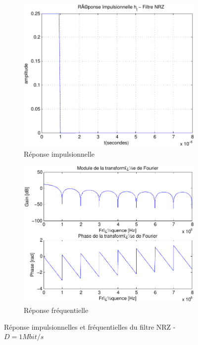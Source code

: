 \documentclass[a4paper,11pt]{article}
\begin{document}
\begin{figure}
	\begin{subfigure}{.5\textwidth}
  		\centering
  		\includegraphics[width=1\linewidth]{impul_nrz-crop.pdf}
  		\caption{Réponse impulsionnelle}
  		\label{fig:nrz_impul1M}
	\end{subfigure}
	\begin{subfigure}{.5\textwidth}
  		\centering
  		\includegraphics[width=1\linewidth]{frec_nrz-crop.pdf}
  		\caption{Réponse fréquentielle}
  		\label{fig:nrz_frec1M}
	\end{subfigure}%
	\caption{Réponse impulsionnelles et fréquentielles du filtre NRZ - $D=1 Mbit/s$}
	\label{fig:nrz1M}
\end{figure} 
\end{document}
